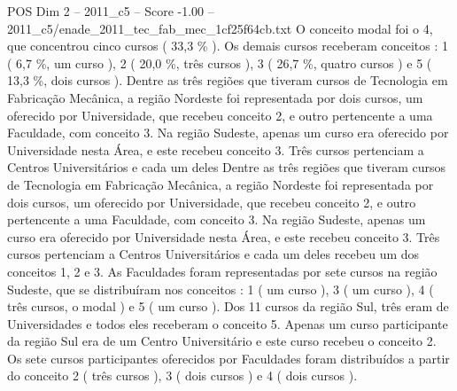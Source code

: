 \begin{textsample}{POS Dim 2 – 2011\_c5 – Score -1.00 – 2011\_c5/enade\_2011\_tec\_fab\_mec\_1cf25f64cb.txt}
O conceito modal foi o 4, que concentrou cinco cursos ( 33,3 \% ).
Os demais cursos receberam conceitos : 1 ( 6,7 \%, um curso ), 2 ( 20,0 \%, três cursos ), 3 ( 26,7 \%, quatro cursos ) e 5 ( 13,3 \%, dois cursos ).
Dentre as três regiões que tiveram cursos de Tecnologia em Fabricação Mecânica, a região Nordeste foi representada por dois cursos, um oferecido por Universidade, que recebeu conceito 2, e outro pertencente a uma Faculdade, com conceito 3.
Na região Sudeste, apenas um curso era oferecido por Universidade nesta Área, e este recebeu conceito 3.
Três cursos pertenciam a Centros Universitários e cada um deles Dentre as três regiões que tiveram cursos de Tecnologia em Fabricação Mecânica, a região Nordeste foi representada por dois cursos, um oferecido por Universidade, que recebeu conceito 2, e outro pertencente a uma Faculdade, com conceito 3.
Na região Sudeste, apenas um curso era oferecido por Universidade nesta Área, e este recebeu conceito 3.
Três cursos pertenciam a Centros Universitários e cada um deles recebeu um dos conceitos 1, 2 e 3.
As Faculdades foram representadas por sete cursos na região Sudeste, que se distribuíram nos conceitos : 1 ( um curso ), 3 ( um curso ), 4 ( três cursos, o modal ) e 5 ( um curso ).
Dos 11 cursos da região Sul, três eram de Universidades e todos eles receberam o conceito 5.
Apenas um curso participante da região Sul era de um Centro Universitário e este curso recebeu o conceito 2.
Os sete cursos participantes oferecidos por Faculdades foram distribuídos a partir do conceito 2 ( três cursos ), 3 ( dois cursos ) e 4 ( dois cursos ).

\end{textsample}
